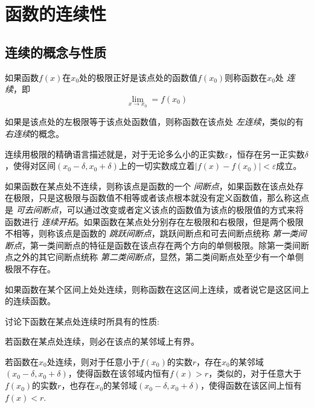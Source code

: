 
\section{函数的连续性}
\label{sec:the-continuity-of-function}

\subsection{连续的概念与性质}
\label{sec:the-concept-and-properties-of-continuity-function}

\begin{definition}
  如果函数$f(x)$在$x_0$处的极限正好是该点处的函数值$f(x_0)$则称函数在$x_0$处 \emph{连续}，即
  \[ \lim_{x \to x_0} = f(x_0) \]
\end{definition}

如果是该点处的左极限等于该点处函数值，则称函数在该点处 \emph{左连续}，类似的有 \emph{右连续}的概念。

连续用极限的精确语言描述就是，对于无论多么小的正实数$\varepsilon$，恒存在另一正实数$\delta$，使得对区间$(x_0-\delta, x_0+\delta)$上的一切实数成立着$|f(x)-f(x_0)|<\varepsilon$成立。

如果函数在某点处不连续，则称该点是函数的一个 \emph{间断点}，如果函数在该点处存在极限，只是这极限与函数值不相等或者该点根本就没有定义函数值，那么称这点是 \emph{可去间断点}，可以通过改变或者定义该点的函数值为该点的极限值的方式来将函数进行 \emph{连续开拓}。如果函数在某点处分别存在左极限和右极限，但是两个极限不相等，则称该点是函数的 \emph{跳跃间断点}，跳跃间断点和可去间断点统称 \emph{第一类间断点}，第一类间断点的特征是函数在该点存在两个方向的单侧极限。除第一类间断点之外的其它间断点统称 \emph{第二类间断点}，显然，第二类间断点处至少有一个单侧极限不存在。

\begin{definition}
  如果函数在某个区间上处处连续，则称函数在这区间上连续，或者说它是这区间上的连续函数。
\end{definition}

讨论下函数在某点处连续时所具有的性质:
\begin{theorem}[局部有界性]
  若函数在某点处连续，则必在该点的某邻域上有界。
\end{theorem}

\begin{theorem}[局部保号性]
  若函数在$x_0$处连续，则对于任意小于$f(x_0)$的实数$r$，存在$x_0$的某邻域$(x_0-\delta,x_0+\delta)$，使得函数在该邻域内恒有$f(x)>r$，类似的，对于任意大于$f(x_0)$的实数$r$，也存在$x_0$的某邻域$(x_0-\delta,x_0+\delta)$，使得函数在该区间上恒有$f(x)<r$.
\end{theorem}


